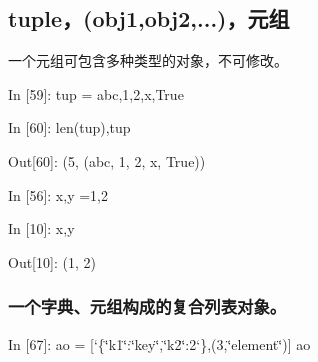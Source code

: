 \documentclass[letterpaper,10pt,english]{sphinxmanual}
\def\PYGZob{\char`\{}
\def\PYGZcb{\char`\}}
\def\PYGZsq{\char`\'}
\def\PYGZdq{\char`\"}
\renewcommand\PYGZsq{\textquotesingle}
\begin{document}
\subsection{tuple，(obj1,obj2,...)，元组}
\label{pystart_databasic:tuple_uff0c(obj1,obj2,...)_uff0c_u5143_u7ec4}
一个元组可包含多种类型的对象，不可修改。

\begin{OriginalVerbatim}[commandchars=\\\{\}]
\textcolor{nbsphinxin}{In [59]: }tup = \PYGZsq{}abc\PYGZsq{},1,2,\PYGZsq{}x\PYGZsq{},True
\end{OriginalVerbatim}

\begin{OriginalVerbatim}[commandchars=\\\{\}]
\textcolor{nbsphinxin}{In [60]: }len(tup),tup
\end{OriginalVerbatim}

\begin{OriginalVerbatim}[commandchars=\\\{\}]
\textcolor{nbsphinxout}{Out[60]: }(5, (\PYGZsq{}abc\PYGZsq{}, 1, 2, \PYGZsq{}x\PYGZsq{}, True))
\end{OriginalVerbatim}

\begin{OriginalVerbatim}[commandchars=\\\{\}]
\textcolor{nbsphinxin}{In [56]: }x,y =1,2
\end{OriginalVerbatim}

\begin{OriginalVerbatim}[commandchars=\\\{\}]
\textcolor{nbsphinxin}{In [10]: }x,y
\end{OriginalVerbatim}

\begin{OriginalVerbatim}[commandchars=\\\{\}]
\textcolor{nbsphinxout}{Out[10]: }(1, 2)
\end{OriginalVerbatim}


\subsubsection{一个字典、元组构成的复合列表对象。}
\label{pystart_databasic:_u4e00_u4e2a_u5b57_u5178_u3001_u5143_u7ec4_u6784_u6210_u7684_u590d_u5408_u5217_u8868_u5bf9_u8c61_u3002}
\begin{OriginalVerbatim}[commandchars=\\\{\}]
\textcolor{nbsphinxin}{In [67]: }ao = [\PYGZob{}\PYGZdq{}k1\PYGZdq{}:\PYGZdq{}key\PYGZdq{},\PYGZdq{}k2\PYGZdq{}:2\PYGZcb{},(3,\PYGZdq{}element\PYGZdq{})]
         ao
\end{OriginalVerbatim}
\end{document}
